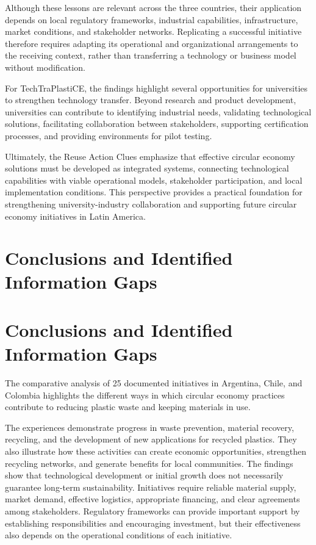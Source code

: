 \documentclass[
  12pt,
  oneside]{book}
\begin{document}
Although these lessons are relevant across the three countries, their
application depends on local regulatory frameworks, industrial
capabilities, infrastructure, market conditions, and stakeholder
networks. Replicating a successful initiative therefore requires
adapting its operational and organizational arrangements to the
receiving context, rather than transferring a technology or business
model without modification.

For TechTraPlastiCE, the findings highlight several opportunities for
universities to strengthen technology transfer. Beyond research and
product development, universities can contribute to identifying
industrial needs, validating technological solutions, facilitating
collaboration between stakeholders, supporting certification processes,
and providing environments for pilot testing.

Ultimately, the Reuse Action Clues emphasize that effective circular
economy solutions must be developed as integrated systems, connecting
technological capabilities with viable operational models, stakeholder
participation, and local implementation conditions. This perspective
provides a practical foundation for strengthening university-industry
collaboration and supporting future circular economy initiatives in
Latin America.

\chapter{Conclusions and Identified Information
Gaps}\label{conclusions-and-identified-information-gaps}

\chapter{Conclusions and Identified Information
Gaps}\label{conclusions-and-identified-information-gaps-1}

The comparative analysis of 25 documented initiatives in Argentina,
Chile, and Colombia highlights the different ways in which circular
economy practices contribute to reducing plastic waste and keeping
materials in use.

The experiences demonstrate progress in waste prevention, material
recovery, recycling, and the development of new applications for
recycled plastics. They also illustrate how these activities can create
economic opportunities, strengthen recycling networks, and generate
benefits for local communities. The findings show that technological
development or initial growth does not necessarily guarantee long-term
sustainability. Initiatives require reliable material supply, market
demand, effective logistics, appropriate financing, and clear agreements
among stakeholders. Regulatory frameworks can provide important support
by establishing responsibilities and encouraging investment, but their
effectiveness also depends on the operational conditions of each
initiative.
\end{document}
